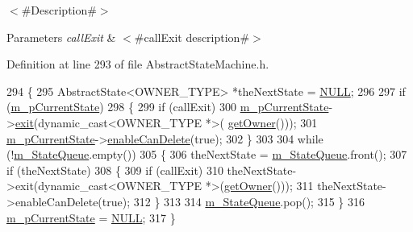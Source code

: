 $<$\#\+Description\#$>$


\begin{DoxyParams}{Parameters}
{\em call\+Exit} & $<$\#call\+Exit description\#$>$ \\
\hline
\end{DoxyParams}


Definition at line 293 of file Abstract\+State\+Machine.\+h.


\begin{DoxyCode}
294   \{
295     AbstractState<OWNER\_TYPE> *theNextState = \mbox{\hyperlink{_abstract_state_8h_a070d2ce7b6bb7e5c05602aa8c308d0c4}{NULL}};
296 
297     \textcolor{keywordflow}{if} (\mbox{\hyperlink{classnjli_1_1_abstract_state_machine_ae82332bd955b01fa48471ec0613e8207}{m\_pCurrentState}})
298       \{
299         \textcolor{keywordflow}{if} (callExit)
300           \mbox{\hyperlink{classnjli_1_1_abstract_state_machine_ae82332bd955b01fa48471ec0613e8207}{m\_pCurrentState}}->\mbox{\hyperlink{classnjli_1_1_abstract_state_a75207a4c62f813d8d84168024a30c60a}{exit}}(dynamic\_cast<OWNER\_TYPE *>(
      \mbox{\hyperlink{classnjli_1_1_abstract_state_machine_aabf808253d72265695e03c299a434798}{getOwner}}()));
301         \mbox{\hyperlink{classnjli_1_1_abstract_state_machine_ae82332bd955b01fa48471ec0613e8207}{m\_pCurrentState}}->\mbox{\hyperlink{classnjli_1_1_abstract_state_a4ed007508bd8f80af668a302376b7d1a}{enableCanDelete}}(\textcolor{keyword}{true});
302       \}
303 
304     \textcolor{keywordflow}{while} (!\mbox{\hyperlink{classnjli_1_1_abstract_state_machine_afc1c0619e024e807c01802979d5ef3db}{m\_StateQueue}}.empty())
305       \{
306         theNextState = \mbox{\hyperlink{classnjli_1_1_abstract_state_machine_afc1c0619e024e807c01802979d5ef3db}{m\_StateQueue}}.front();
307         \textcolor{keywordflow}{if} (theNextState)
308           \{
309             \textcolor{keywordflow}{if} (callExit)
310               theNextState->exit(dynamic\_cast<OWNER\_TYPE *>(\mbox{\hyperlink{classnjli_1_1_abstract_state_machine_aabf808253d72265695e03c299a434798}{getOwner}}()));
311             theNextState->enableCanDelete(\textcolor{keyword}{true});
312           \}
313 
314         \mbox{\hyperlink{classnjli_1_1_abstract_state_machine_afc1c0619e024e807c01802979d5ef3db}{m\_StateQueue}}.pop();
315       \}
316     \mbox{\hyperlink{classnjli_1_1_abstract_state_machine_ae82332bd955b01fa48471ec0613e8207}{m\_pCurrentState}} = \mbox{\hyperlink{_abstract_state_8h_a070d2ce7b6bb7e5c05602aa8c308d0c4}{NULL}};
317   \}
\end{DoxyCode}
\mbox{\label{classnjli_1_1_abstract_state_machine_a83a8876ae63b92804004cf3febe76573}} 
